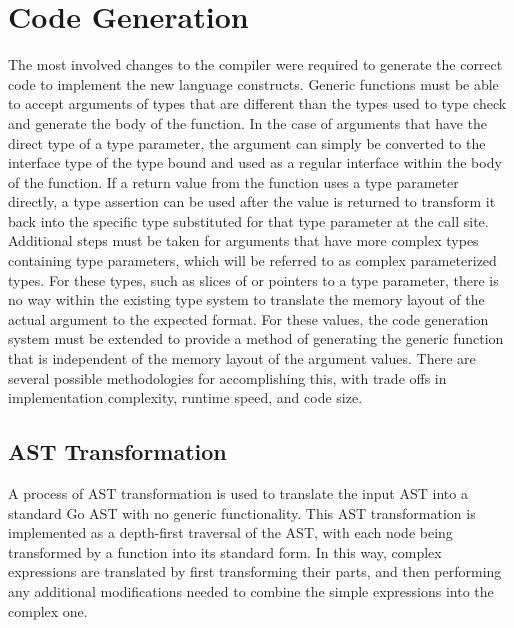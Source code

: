 \documentclass[letterpaper,11pt]{article}
\begin{document}
\section{Code Generation} \label{codegeneration}

The most involved changes to the compiler were required to generate the correct code to implement the new language constructs. Generic functions must be able to accept arguments of types that are different than the types used to type check and generate the body of the function. In the case of arguments that have the direct type of a type parameter, the argument can simply be converted to the interface type of the type bound and used as a regular interface within the body of the function. If a return value from the function uses a type parameter directly, a type assertion can be used after the value is returned to transform it back into the specific type substituted for that type parameter at the call site. Additional steps must be taken for arguments that have more complex types containing type parameters, which will be referred to as complex parameterized types. For these types, such as slices of or pointers to a type parameter, there is no way within the existing type system to translate the memory layout of the actual argument to the expected format. For these values, the code generation system must be extended to provide a method of generating the generic function that is independent of the memory layout of the argument values. There are several possible methodologies for accomplishing this, with trade offs in implementation complexity, runtime speed, and code size. 

\subsection{AST Transformation} \label{asttransformation}

A process of AST transformation is used to translate the input AST into a standard Go AST with no generic functionality. This AST transformation is implemented as a depth-first traversal of the AST, with each node being transformed by a function into its standard form. In this way, complex expressions are translated by first transforming their parts, and then performing any additional modifications needed to combine the simple expressions into the complex one.
\end{document}

